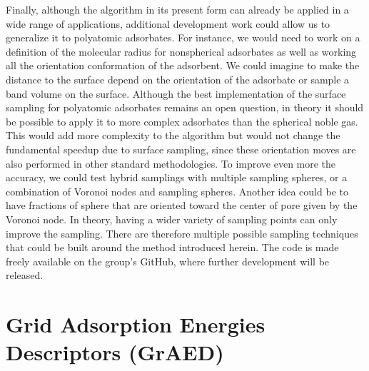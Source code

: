 \documentclass[main]{subfiles}
\begin{document}
Finally, although the algorithm in its present form can already be applied in a wide range of applications, additional development work could allow us to generalize it to polyatomic adsorbates. For instance, we would need to {work on a definition of the molecular radius for nonspherical adsorbates as well as working} all the orientation conformation of the adsorbent. {We could imagine to make the distance to the surface depend on the orientation of the adsorbate or sample a band volume on the surface. Although the best implementation of the surface sampling for polyatomic adsorbates remains an open question, in theory it should be possible to apply it to more complex adsorbates than the spherical noble gas. } This would add more complexity to the algorithm but would not change the fundamental speedup due to surface sampling, since these orientation moves are also performed in other standard methodologies. To improve even more the accuracy, we could test hybrid samplings with multiple sampling spheres, or a combination of Voronoi nodes and sampling spheres. Another idea could be to have fractions of sphere that are oriented toward the center of pore given by the Voronoi node. In theory, having a wider variety of sampling points can only improve the sampling. There are therefore multiple possible sampling techniques that could be built around the method introduced herein. {The code is made freely available on the group's GitHub, where further development will be released.}


\section{Grid Adsorption Energies Descriptors (GrAED)}
\end{document}
